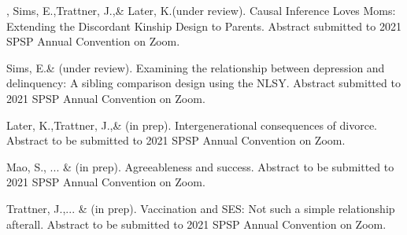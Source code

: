 \item \meb, Sims, E.,\notb Trattner, J.,\nota \& Later, K.\notans (under review). Causal Inference Loves Moms: Extending the Discordant Kinship Design to Parents. Abstract submitted to 2021 SPSP Annual Convention on Zoom.
%
\item Sims, E.\notbns \& \meb (under review). Examining the relationship between depression and delinquency: A sibling comparison design using the NLSY. Abstract submitted to 2021 SPSP Annual Convention on Zoom.
%
\item Later, K.,\nota Trattner, J.,\nota \& \meb (in prep). Intergenerational consequences of divorce. Abstract to be submitted to 2021 SPSP Annual Convention on Zoom.
%
\item Mao, S.\nota, ... \& \meb (in prep). Agreeableness and success. Abstract to be submitted to 2021 SPSP Annual Convention on Zoom.
%
\item Trattner, J.,\nota ... \& \meb (in prep). Vaccination and SES: Not such a simple relationship afterall. Abstract to be submitted to 2021 SPSP Annual Convention on Zoom.